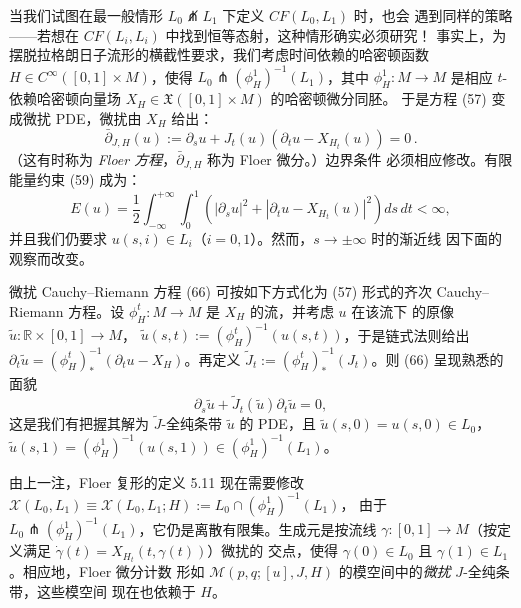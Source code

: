 当我们试图在最一般情形 $L_0\not\pitchfork L_1$ 下定义 $CF(L_0,L_1)$ 时，也会
遇到同样的策略——若想在 $CF(L_i,L_i)$ 中找到恒等态射，这种情形确实必须研究！
事实上，为摆脱拉格朗日子流形的横截性要求，我们考虑时间依赖的哈密顿函数
$H\in C^\infty([0,1]\times M)$，使得
$L_0\pitchfork(\phi_H^1)^{-1}(L_1)$，其中 $\phi_H^1:M\to M$ 是相应
$t$-依赖哈密顿向量场 $X_H\in\mathfrak X([0,1]\times M)$ 的哈密顿微分同胚。
于是方程 (57) 变成微扰 PDE，微扰由 $X_H$ 给出：
\begin{equation}
\bar\partial_{J,H}(u):=\partial_su+J_t(u)(\partial_tu-X_{H_t}(u))=0\,.
\label{eq:5.66}
\end{equation}
（这有时称为 \emph{Floer 方程}，$\bar\partial_{J,H}$ 称为 Floer 微分。）边界条件
必须相应修改。有限能量约束 (59) 成为：
\begin{equation}
E(u)=\frac12\int_{-\infty}^{+\infty}\!\!\int_0^1
\left(|\partial_su|^2+|\partial_tu-X_{H_t}(u)|^2\right)ds\,dt<\infty,
\label{eq:5.67}
\end{equation}
并且我们仍要求 $u(s,i)\in L_i$（$i=0,1$）。然而，$s\to\pm\infty$ 时的渐近线
因下面的观察而改变。

\begin{Rem}\label{rem:5.25}
微扰 Cauchy--Riemann 方程 (66) 可按如下方式化为 (57) 形式的齐次
Cauchy--Riemann 方程。设 $\phi_H^t:M\to M$ 是 $X_H$ 的流，并考虑 $u$ 在该流下
的原像 $\tilde u:\mathbb R\times[0,1]\to M$，
$\tilde u(s,t):=(\phi_H^t)^{-1}(u(s,t))$，于是链式法则给出
$\partial_t\tilde u=(\phi_H^t)^{-1}_*(\partial_tu-X_H)$。再定义
$\tilde J_t:=(\phi_H^t)^{-1}_*(J_t)$。则 (66) 呈现熟悉的面貌
\[
\partial_s\tilde u+\tilde J_t(\tilde u)\partial_t\tilde u=0,
\]
这是我们有把握其解为 $\tilde J$-全纯条带 $\tilde u$ 的 PDE，且
$\tilde u(s,0)=u(s,0)\in L_0$，
$\tilde u(s,1)=(\phi_H^1)^{-1}(u(s,1))\in(\phi_H^1)^{-1}(L_1)$。
\end{Rem}


由上一注，Floer 复形的定义 5.11 现在需要修改
$\mathcal X(L_0,L_1)\equiv\mathcal X(L_0,L_1;H):=L_0\cap(\phi_H^1)^{-1}(L_1)$，
由于 $L_0\pitchfork(\phi_H^1)^{-1}(L_1)$，它仍是离散有限集。生成元是按流线
$\gamma:[0,1]\to M$（按定义满足 $\dot\gamma(t)=X_{H_t}(t,\gamma(t))$）微扰的
交点，使得 $\gamma(0)\in L_0$ 且 $\gamma(1)\in L_1$。相应地，Floer 微分计数
形如 $\mathcal M(p,q;[u],J,H)$ 的模空间中的\emph{微扰} $J$-全纯条带，这些模空间
现在也依赖于 $H$。

